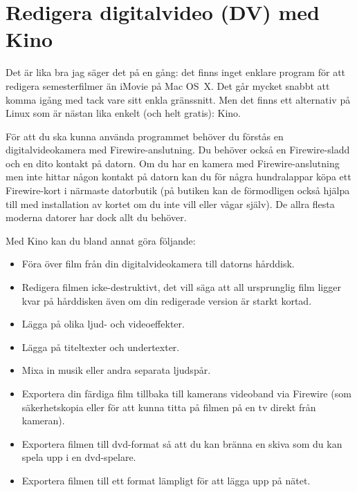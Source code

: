 \documentclass[a4paper,final]{memoir} %
\begin{document}


\section{Redigera digitalvideo (DV) med Kino}


Det är lika bra jag säger det på en gång: det finns inget enklare program för att redigera semesterfilmer än iMovie på Mac OS~X. Det går mycket snabbt att komma igång med tack vare sitt enkla gränssnitt. Men det finns ett alternativ på Linux som är nästan lika enkelt (och helt gratis): Kino. 

För att du ska kunna använda programmet behöver du förstås en digitalvideokamera med Firewire-anslutning. Du behöver också en Firewire-sladd och en dito kontakt på datorn. Om du har en kamera med Firewire-anslutning men inte hittar någon kontakt på datorn kan du för några hundralappar köpa ett Firewire-kort i närmaste datorbutik (på butiken kan de förmodligen också hjälpa till med installation av kortet om du inte vill eller vågar själv). De allra flesta moderna datorer har dock allt du behöver. 

Med Kino kan du bland annat göra följande:

\begin{itemize}

\item Föra över film från din digitalvideokamera till datorns hårddisk.

\item Redigera filmen icke-destruktivt, det vill säga att all ursprunglig film ligger kvar på hårddisken även om din redigerade version är starkt kortad.

\item Lägga på olika ljud- och videoeffekter.

\item Lägga på titeltexter och undertexter.

\item Mixa in musik eller andra separata ljudspår.

\item Exportera din färdiga film tillbaka till kamerans videoband via Firewire (som säkerhetskopia eller för att kunna titta på filmen på en tv direkt från kameran).

\item Exportera filmen till dvd-format så att du kan bränna en skiva som du kan spela upp i en dvd-spelare.

\item Exportera filmen till ett format lämpligt för att lägga upp på nätet.

\end{itemize}
\end{document}
